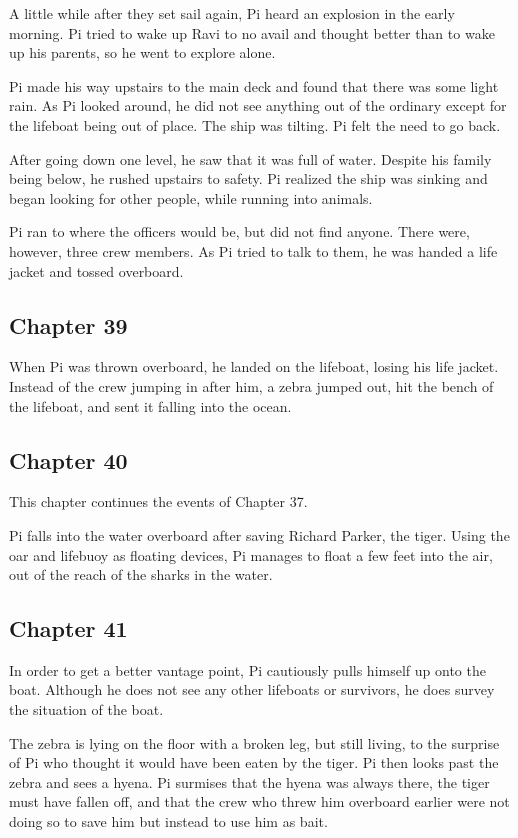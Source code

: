\documentclass[11pt]{article}
\begin{document}
A little while after they set sail again, Pi heard an explosion in the early morning. Pi tried to wake up Ravi to no avail and thought better than to wake up his parents, so he went to explore alone.

Pi made his way upstairs to the main deck and found that there was some light rain. As Pi looked around, he did not see anything out of the ordinary except for the lifeboat being out of place. The ship was tilting. Pi felt the need to go back.

After going down one level, he saw that it was full of water. Despite his family being below, he rushed upstairs to safety. Pi realized the ship was sinking and began looking for other people, while running into animals.

Pi ran to where the officers would be, but did not find anyone. There were, however, three crew members. As Pi tried to talk to them, he was handed a life jacket and tossed overboard.
\subsection{Chapter 39}
\label{sec:org0bbab65}
When Pi was thrown overboard, he landed on the lifeboat, losing his life jacket. Instead of the crew jumping in after him, a zebra jumped out, hit the bench of the lifeboat, and sent it falling into the ocean.
\subsection{Chapter 40}
\label{sec:org26dab1f}
This chapter continues the events of Chapter 37.

Pi falls into the water overboard after saving Richard Parker, the tiger. Using the oar and lifebuoy as floating devices, Pi manages to float a few feet into the air, out of the reach of the sharks in the water.
\subsection{Chapter 41}
\label{sec:orge7e80a5}
In order to get a better vantage point, Pi cautiously pulls himself up onto the boat. Although he does not see any other lifeboats or survivors, he does survey the situation of the boat. 

The zebra is lying on the floor with a broken leg, but still living, to the surprise of Pi who thought it would have been eaten by the tiger. Pi then looks past the zebra and sees a hyena. Pi surmises that the hyena was always there, the tiger must have fallen off, and that the crew who threw him overboard earlier were not doing so to save him but instead to use him as bait.
\end{document}
